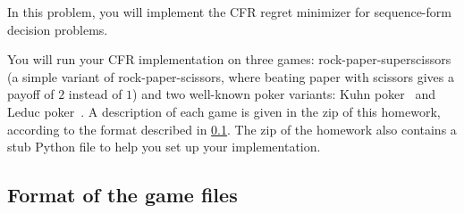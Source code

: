 \documentclass{homework}
\begin{document}
In this problem, you will implement the CFR regret minimizer for sequence-form decision problems.

You will run your CFR implementation on three games: rock-paper-superscissors (a simple variant of rock-paper-scissors, where beating paper with scissors gives a payoff of $2$ instead of $1$) and two well-known poker variants: Kuhn poker~\citep{Kuhn50:Simplified} and Leduc poker~\citep{Southey05:Bayes}. A description of each game is given in the zip of this homework, according to the format described in \cref{sec:format}. The zip of the homework also contains a stub Python file to help you set up your implementation. 

\subsection{Format of the game files}\label{sec:format}
\end{document}
